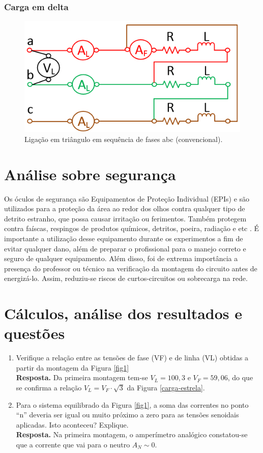 \documentclass[a4paper,12pt,oneside,openany,table,xcdraw]{article}
\begin{document}
\subsubsection{Carga em delta}
\begin{figure}[H]
\centering
\captionsetup{font=scriptsize}
\includegraphics[width=14cm]{fig2}
\caption{Ligação em triângulo em sequência de fases abc (convencional).}
\label{fig2}
\end{figure}

\section{Análise sobre segurança} %
Os óculos de segurança são Equipamentos de Proteção Individual (EPIs) e são utilizados para a proteção da área ao redor dos olhos contra qualquer tipo de detrito estranho, que possa causar irritação ou ferimentos. Também protegem contra faíscas, respingos de produtos químicos, detritos, poeira, radiação e etc \cite{safe}.
É importante a utilização desse equipamento durante os experimentos a fim de evitar qualquer dano, além de preparar o profissional para o manejo correto e seguro de qualquer equipamento.
Além disso, foi de extrema importância a presença do professor ou técnico na verificação da montagem do circuito antes de energizá-lo. Assim, reduziu-se riscos de curtos-circuitos ou sobrecarga na rede.

\section{Cálculos, análise dos resultados e questões} %
\begin{enumerate}[1)]
\item Verifique a relação entre as tensões de fase (VF)  e de linha (VL) obtidas a partir da montagem da Figura \ref{fig1}\\
\textbf{Resposta.} Da primeira montagem tem-se $V_L=100,3$ e $V_F=59,06$, do que se confirma a relação $V_L=V_F\cdot\sqrt{3}$ da Figura \ref{carga-estrela}.

\item Para o sistema equilibrado da Figura \ref{fig1}, a soma das correntes no ponto “n” deveria ser igual ou muito próximo a zero para as tensões senoidais aplicadas. Isto aconteceu? Explique. \\
\textbf{Resposta.} Na primeira montagem, o amperímetro analógico constatou-se que a corrente que vai para o neutro $A_N\sim 0$. 

\end{enumerate}
\end{document}
